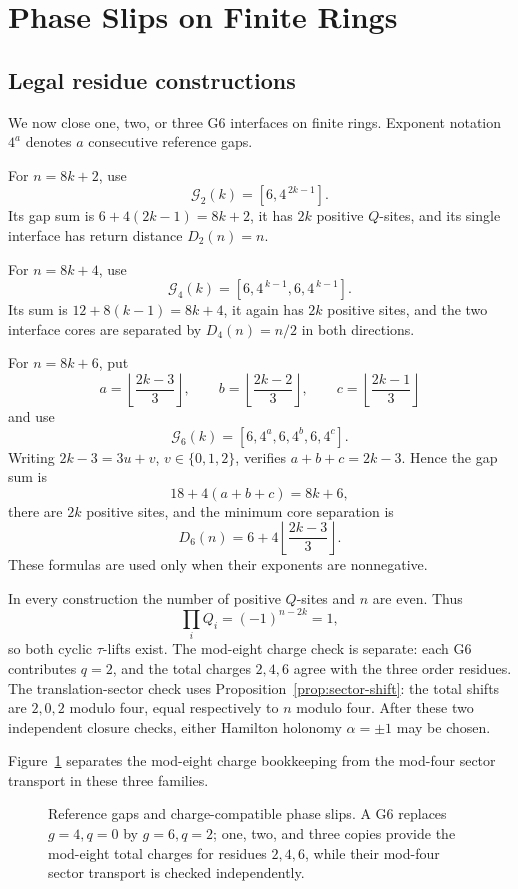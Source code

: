 \section{Phase Slips on Finite Rings}
\label{sec:finite-rings}

\subsection{Legal residue constructions}
\label{subsec:legal-residue-constructions}

We now close one, two, or three G6 interfaces on finite rings.  Exponent
notation \(4^a\) denotes \(a\) consecutive reference gaps.

For \(n=8k+2\), use
\[
\mathcal G_2(k)=[6,4^{\,2k-1}].
\]
Its gap sum is \(6+4(2k-1)=8k+2\), it has \(2k\) positive \(Q\)-sites,
and its single interface has return distance \(D_2(n)=n\).

For \(n=8k+4\), use
\[
\mathcal G_4(k)=[6,4^{\,k-1},6,4^{\,k-1}].
\]
Its sum is \(12+8(k-1)=8k+4\), it again has \(2k\) positive sites, and
the two interface cores are separated by \(D_4(n)=n/2\) in both directions.

For \(n=8k+6\), put
\[
a=\left\lfloor\frac{2k-3}{3}\right\rfloor,\qquad
b=\left\lfloor\frac{2k-2}{3}\right\rfloor,\qquad
c=\left\lfloor\frac{2k-1}{3}\right\rfloor
\]
and use
\[
\mathcal G_6(k)=[6,4^a,6,4^b,6,4^c].
\]
Writing \(2k-3=3u+v\), \(v\in\{0,1,2\}\), verifies
\(a+b+c=2k-3\).  Hence the gap sum is
\[
18+4(a+b+c)=8k+6,
\]
there are \(2k\) positive sites, and the minimum core separation is
\[
D_6(n)=6+4\left\lfloor\frac{2k-3}{3}\right\rfloor.
\]
These formulas are used only when their exponents are nonnegative.

In every construction the number of positive \(Q\)-sites and \(n\) are
even.  Thus
\[
\prod_iQ_i=(-1)^{n-2k}=1,
\]
so both cyclic \(\tau\)-lifts exist.  The mod-eight charge check is separate:
each G6 contributes \(q=2\), and the total charges \(2,4,6\) agree with the
three order residues.  The translation-sector check uses
Proposition~\ref{prop:sector-shift}: the total shifts are \(2,0,2\) modulo
four, equal respectively to \(n\) modulo four.  After these two independent
closure checks, either Hamilton holonomy \(\alpha=\pm1\) may be chosen.

Figure~\ref{fig:reference-slips} separates the mod-eight charge bookkeeping
from the mod-four sector transport in these three families.
\begin{figure}[t]
\centering

\caption{Reference gaps and charge-compatible phase slips.  A G6 replaces
\(g=4,q=0\) by \(g=6,q=2\); one, two, and three copies provide the mod-eight
total charges for residues \(2,4,6\), while their mod-four sector transport
is checked independently.}
\label{fig:reference-slips}
\end{figure}

